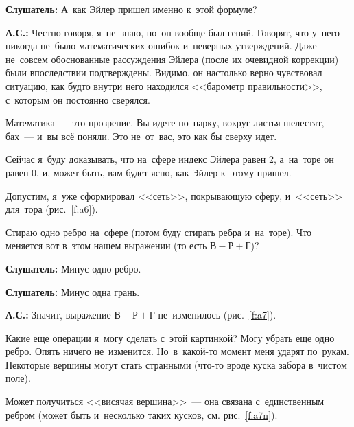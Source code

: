 \textbf{Слушатель:} А~как Эйлер пришел именно к~этой формуле?

\textbf{А.С.:} Честно говоря, я~не~знаю, но~он вообще был гений. Говорят, что у~него никогда не~было
математических ошибок и~неверных утверждений. Даже не~совсем обоснованные рассуждения Эйлера (после
их очевидной коррекции) были впоследствии подтверждены. Видимо, он настолько верно чувствовал
ситуацию, как будто внутри него находился <<барометр правильности>>, с~которым он постоянно
сверялся.


Математика~--- это прозрение. Вы идете по~парку, вокруг листья шелестят, бах~--- и~вы всё поняли.
Это не~от~вас, это как бы сверху идет.

Сейчас я~буду доказывать, что на~сфере индекс Эйлера равен 2, а~на~торе он равен 0, и, может быть,
вам будет ясно, как Эйлер к~этому пришел.


Допустим, я~уже сформировал <<сеть>>, покрывающую сферу, и~<<сеть>> для~тора (рис.~\ref{f:a6}).

Стираю одно ребро на~сфере (потом буду стирать ребра и~на~торе). Что меняется вот в~этом нашем
выражении (то есть $\text{В}-\text{Р}+\text{Г}$)?

\textbf{Слушатель:} Минус одно ребро.

\textbf{Слушатель:} Минус одна грань.

\textbf{А.С.:} Значит, выражение $\text{В}-\text{Р}+\text{Г}$ не~изменилось (рис.~\ref{f:a7}).


Какие еще операции я~могу сделать с~этой картинкой? Могу убрать еще одно ребро. Опять
ничего не~изменится.
 Но~в~какой-то момент меня ударят по~рукам. Некоторые вершины могут стать
странными (что-то вроде куска забора в~чистом поле).

Может получиться <<висячая вершина>>~--- она связана с~единственным ребром (может быть
и~несколько таких кусков, см. рис.~\ref{f:a7n}).

